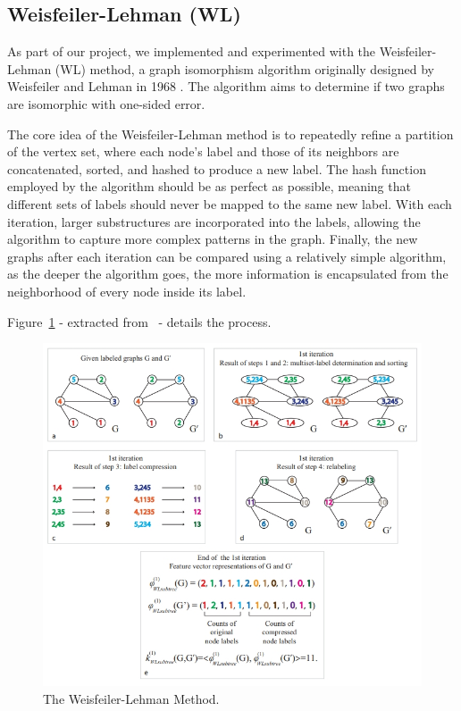 \documentclass{IEEEtran}
\begin{document}
\subsection{Weisfeiler-Lehman (WL)}
As part of our project, we implemented and experimented with the Weisfeiler-Lehman (WL) method,
a graph isomorphism algorithm originally designed by Weisfeiler and Lehman in 1968 \cite{weisfeilerlehman1968}.
The algorithm aims to determine if two graphs are isomorphic with one-sided error.

The core idea of the Weisfeiler-Lehman method is to repeatedly refine a partition of the vertex set, where each node's label and those of its neighbors are concatenated, sorted, and hashed to produce a new label. The hash function employed by the algorithm should be as perfect as possible, meaning that different sets of labels should never be mapped to the same new label. With each iteration, larger substructures are incorporated into the labels, allowing the algorithm to capture more complex patterns in the graph. Finally, the new graphs after each iteration can be compared using a relatively simple algorithm, as the deeper the algorithm goes, the more information is encapsulated from the neighborhood of every node inside its label.

Figure~\ref{fig:wlmethod} - extracted from~\cite{shervashidze11a} - details the process.

\begin{figure}[h]
    \centering
    \includegraphics[width=\linewidth]{wl_process.jpg}
    \caption{The Weisfeiler-Lehman Method.}
    \label{fig:wlmethod}
\end{figure}
\end{document}
